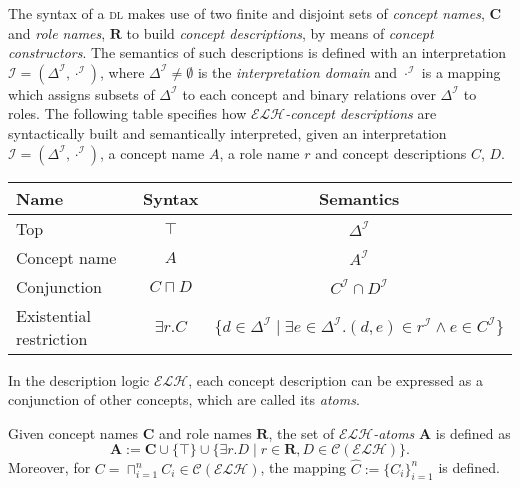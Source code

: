 \documentclass{llncs}
\newcommand{\elh}{\(\mathcal{ELH}\)\xspace}
\newcommand{\DeltaI}{\Delta^\mathcal{I}}
\newcommand{\dotI}{\cdot^{\mathcal{I}}}
\newcommand{\dl}{\textsc{dl}\xspace}
\begin{document}
  The syntax of a \dl makes use of two finite and disjoint sets of \emph{concept names}, \(\mathbf{C}\) and \emph{role names}, \(\mathbf{R}\) to build \emph{concept descriptions}, by means of \emph{concept constructors}.
  The semantics of such descriptions is defined with an interpretation \(\mathcal{I} = (\DeltaI,\dotI)\), where \(\DeltaI \ne \emptyset\) is the \emph{interpretation domain} and \(\dotI\) is a mapping which assigns subsets of \(\DeltaI{}\) to each concept and binary relations over \(\DeltaI\) to roles.
  The following table specifies how \emph{\elh-concept descriptions} are syntactically built and semantically interpreted, given an interpretation \(\mathcal{I} = (\DeltaI,\dotI)\), a concept name \(A\), a role name \(r\) and concept descriptions \(C\), \(D\).
  \begin{center}
    \begin{tabular}{lcc}
      \toprule
      Name & Syntax & Semantics \\
      \midrule
      Top & \(\top\) & \(\DeltaI\) \\
      Concept name & \(A\) & \(A^\mathcal{I}\) \\
      Conjunction & \(C \sqcap D\) & \(C^\mathcal{I} \cap D^\mathcal{I}\) \\
      Existential restriction & \(\exists{}r.C\) &
      \(\lbrace d \in \DeltaI \mid \exists e \in \DeltaI.
      (d,e) \in r^\mathcal{I} \land e \in C^\mathcal{I} \rbrace\) \\
      \bottomrule
    \end{tabular}
  \end{center}

  In the description logic \elh, each concept description can be expressed as a conjunction of other concepts, which are called its \emph{atoms}.
  \begin{definition}[Atoms]
    Given concept names \(\mathbf{C}\) and role names \(\mathbf{R}\), the set of \emph{\elh-atoms} \(\mathbf{A}\) is defined as
    \begin{equation}
      \mathbf{A} := \mathbf{C} \cup \lbrace \top \rbrace \cup \lbrace \exists{}r.D \mid r \in \mathbf{R}, D \in \mathcal{C}(\mathcal{ELH}) \rbrace.
    \end{equation}
    Moreover, for \(C = \sqcap_{i=1}^n C_i \in \mathcal{C}(\mathcal{ELH})\), the mapping
    \(\widehat{C} := \lbrace C_i\rbrace_{i=1}^n\) is defined.
  \end{definition}
\end{document}
